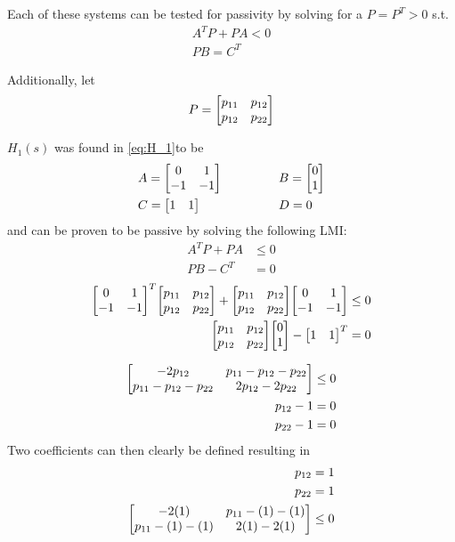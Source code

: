 \documentclass[letter]{article}
\begin{document}
Each of these systems can be tested for passivity by solving for a $P=P^T>0$ s.t.
\begin{align}
	A^T P + P A < 0\\
	PB = C^T
\end{align}

Additionally, let $$P = \mqty[p_{11} & p_{12}\\ p_{12} & p_{22}]$$

\newpage
$H_1(s)$ was found in \eqref{eq:H_1}to be
\begin{equation}\nonumber
	\begin{aligned}
		&A = \mqty[0 &1\\ -1 &-1] \hspace{0.5in} &&B = \mqty[0\\ 1]\\
		&C = \mqty[1 & 1] \hspace{0.5in} &&D = 0
	\end{aligned}
\end{equation}
and can be proven to be passive by solving the following LMI:
\begin{align}
	A^T P + P A &\leq 0\\
	P B - C^T &= 0
\end{align}
\begin{align}
	\mqty[0 &1\\ -1 &-1]^T \mqty[p_{11} & p_{12}\\ p_{12} & p_{22}] + \mqty[p_{11} & p_{12}\\ p_{12} & p_{22}] \mqty[0 &1\\ -1 &-1] &\leq 0\\
	\mqty[p_{11} & p_{12}\\ p_{12} & p_{22}] \mqty[0\\ 1] - \mqty[1 & 1]^T &= 0
\end{align}

\begin{align}
	\mqty[-2p_{12} & p_{11} - p_{12} - p_{22}\\ p_{11} - p_{12} - p_{22} & 2 p_{12} - 2 p_{22}] &\leq 0\\
	p_{12} - 1 &= 0\\
	p_{22} - 1 &= 0
\end{align}
Two coefficients can then clearly be defined resulting in
\begin{align}
	p_{12} &= 1\\
	p_{22} &= 1\\
	\mqty[-2(1) & p_{11} - (1) - (1)\\ p_{11} - (1) - (1) & 2 (1) - 2 (1)] &\leq 0
\end{align}
\end{document}
